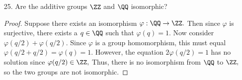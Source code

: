 \documentclass{article}
\begin{document}
\begin{itemize}
\begin{proof}
			We can also find each element's inverse. From above, we have $\begin{bmatrix}
				0 & -1 \\ 1 & 0
			\end{bmatrix}$ and $\begin{bmatrix}
				0 & 1 \\ -1 & 0
			\end{bmatrix}$ are inverses of each other, and $\begin{bmatrix}
				-1 & 0 \\ 0 & -1
			\end{bmatrix}\inv=\begin{bmatrix}
				-1 & 0 \\ 0 & -1
			\end{bmatrix}.$ Thus, $G$ is indeed a subgroup.

			If we define the mapping $\alpha:G\to \left\{ 1, -1, i, -i \right\}$ such that
			\begin{align*}
				\alpha\left( \begin{bmatrix}
					1 & 0 \\ 0 & 1
				\end{bmatrix}\right)=1 & &\alpha\left( \begin{bmatrix}
					-1 & 0 \\ 0 & -1
				\end{bmatrix}\right)=-1 \\
				\alpha\left( \begin{bmatrix}
					0 & -1 \\ 1 & 0
				\end{bmatrix}\right)= i & & \alpha\left( \begin{bmatrix}
					0 & 1 \\ -1 & 0
				\end{bmatrix}\right)= -i
			\end{align*}
			it's clear that $\alpha$ is surjective and injective, and it satisfies the properties of a group homomorphism (easy to check). The inverse is just the same mapping in the other direction, so $G$ is isomorphic to $\left\{ 1, -1, i, -i \right\}$ as desired.
			
		\end{proof}

	\item[25.] Are the additive groups $\ZZ$ and $\QQ$ isomorphic? 
		\begin{proof}
			Suppose there exists an isomorphism $\varphi:\QQ\to\ZZ.$ Then since $\varphi$ is surjective, there exists a $q\in\QQ$ such that $\varphi(q)=1.$ Now consider $\varphi(q/2)+\varphi(q/2).$ Since $\varphi$ is a group homomorphism, this must equal $\varphi(q/2+q/2)=\varphi(q)=1.$ However, the equation $2\varphi(q/2)=1$ has no solution since $\varphi(q/2)\in\ZZ,$ Thus, there is no isomorphism from $\QQ$ to $\ZZ,$ so the two groups are not isomorphic.
			

\end{proof}
\end{itemize}
\end{document}
